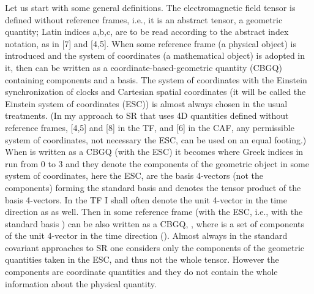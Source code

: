 \documentclass[a4paper,showpacs,preprintnumbers,amsmath,amssymb]{revtex4}
\begin{document}
Let us start with some general definitions. The electromagnetic field tensor
\coordHE{} is defined without reference frames, i.e., it is an abstract
tensor, a geometric quantity; Latin indices a,b,c, are to be read according
to the abstract index notation, as in [7] and [4,5]. When some reference
frame (a physical object) is introduced and the system of coordinates (a
mathematical object) is adopted in it, then \coordHE{} can be written as a
coordinate-based-geometric quantity (CBGQ) containing components and a
basis. The system of coordinates with the Einstein synchronization of clocks
and Cartesian spatial coordinates (it will be called the Einstein system of
coordinates (ESC)) is almost always chosen in the usual treatments. (In my
approach to SR that uses 4D quantities defined without reference frames,
[4,5] and [8] in the TF, and [6] in the CAF, any permissible system of
coordinates, not necessary the ESC, can be used on an equal footing.) When \coordHE{} is written as a CBGQ (with the ESC) it becomes \coordHE{} where Greek indices \myHighlight{$\mu ,\nu $}\coordHE{} in \coordHE{} run from 0 to 3 and they denote the components of the
geometric object \coordHE{} in some system of coordinates, here the ESC, \myHighlight{$%
\gamma _{\mu }$}\coordHE{} are the basis 4-vectors (not the components) forming the
standard basis \myHighlight{$\left\{ \gamma _{\mu }\right\} $}\coordHE{} and \myHighlight{$^{\prime }\otimes
^{\prime }$}\coordHE{} denotes the tensor product of the basis 4-vectors. In the TF I
shall often denote the unit 4-vector in the time direction \coordHE{} as \coordHE{} as well. Then in some reference frame (with the ESC, i.e., with the
standard basis \myHighlight{$\left\{ \gamma _{\mu }\right\} $}\coordHE{}) \coordHE{} can be also
written as a CBGQ, \coordHE{}, where \coordHE{} is a set
of components of the unit 4-vector in the time direction (\coordHE{}). Almost always in the standard covariant approaches to SR
one considers only the components of the geometric quantities taken in the
ESC, and thus not the whole tensor. However the components are coordinate
quantities and they do not contain the whole information about the physical
quantity.
\end{document}
